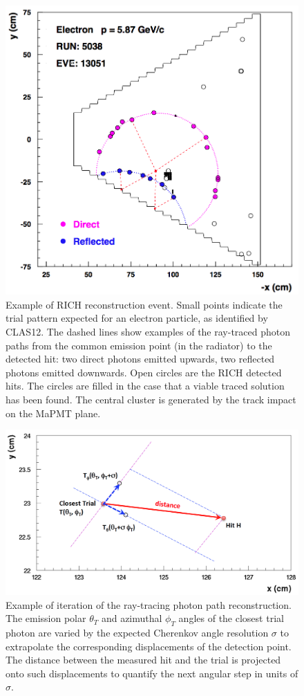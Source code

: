 \begin{figure}[t]
\begin{center}
\includegraphics[width=0.8\columnwidth]{pics/example.png}
\end{center}
\caption{Example of RICH reconstruction event. Small points indicate the trial pattern expected for an electron particle, as identified by CLAS12. The dashed lines show examples of the ray-traced photon paths from the common emission point (in the radiator) to the detected hit: two direct photons emitted upwards, two reflected photons emitted downwards. Open circles are the RICH detected hits. The circles are filled in the case that a viable traced solution has been found. The central cluster is generated by the track impact on the MaPMT plane.}
\label{Fig:RayShow}
\end{figure}

\begin{figure}[t]
\begin{center}
\includegraphics[width=1.0\columnwidth]{pics/ray_trace_example.png}
\end{center}
\caption{Example of iteration of the ray-tracing photon path reconstruction. The emission polar $\theta_T$ and azimuthal $\phi_T$ angles of the closest trial photon are varied by the expected Cherenkov angle resolution $\sigma$ to extrapolate the corresponding displacements of the detection point. The distance between the measured hit and the trial is projected onto such displacements to quantify the next angular step in units of $\sigma$.}
\label{Fig:RayAlgo}
\end{figure}


